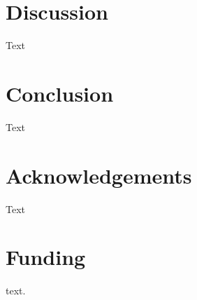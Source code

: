 \documentclass{bioinfo}
\begin{document}
\section{Discussion}

Text

\section{Conclusion}

Text

\section*{Acknowledgements}

Text\vspace*{-12pt}

\section*{Funding}

 text.\vspace*{-12pt}



\end{document}
